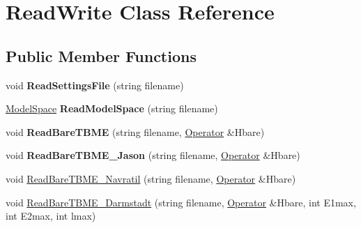 \hypertarget{classReadWrite}{\section{Read\-Write Class Reference}
\label{classReadWrite}
}
\subsection*{Public Member Functions}
\begin{DoxyCompactItemize}
\item 
\hypertarget{classReadWrite_a7074f8c5e6b1bbeb90a4c534b913ac53}{void {\bfseries Read\-Settings\-File} (string filename)}\label{classReadWrite_a7074f8c5e6b1bbeb90a4c534b913ac53}

\item 
\hypertarget{classReadWrite_adbf1ad5fe47c97c87994cfc28df5c740}{\hyperlink{classModelSpace}{Model\-Space} {\bfseries Read\-Model\-Space} (string filename)}\label{classReadWrite_adbf1ad5fe47c97c87994cfc28df5c740}

\item 
\hypertarget{classReadWrite_a7ebe7ea4d8a322b23b144658da562277}{void {\bfseries Read\-Bare\-T\-B\-M\-E} (string filename, \hyperlink{classOperator}{Operator} \&Hbare)}\label{classReadWrite_a7ebe7ea4d8a322b23b144658da562277}

\item 
\hypertarget{classReadWrite_ae5271000cceab5fcebab7e9d2faf9f1f}{void {\bfseries Read\-Bare\-T\-B\-M\-E\-\_\-\-Jason} (string filename, \hyperlink{classOperator}{Operator} \&Hbare)}\label{classReadWrite_ae5271000cceab5fcebab7e9d2faf9f1f}

\item 
void \hyperlink{classReadWrite_ab66f5d7e2e352e973597915c08cad45d}{Read\-Bare\-T\-B\-M\-E\-\_\-\-Navratil} (string filename, \hyperlink{classOperator}{Operator} \&Hbare)
\item 
\hypertarget{classReadWrite_a7d1ea6782d893eab0217bb965fba990e}{void \hyperlink{classReadWrite_a7d1ea6782d893eab0217bb965fba990e}{Read\-Bare\-T\-B\-M\-E\-\_\-\-Darmstadt} (string filename, \hyperlink{classOperator}{Operator} \&Hbare, int E1max, int E2max, int lmax)}\label{classReadWrite_a7d1ea6782d893eab0217bb965fba990e}


\end{DoxyCompactItemize}

